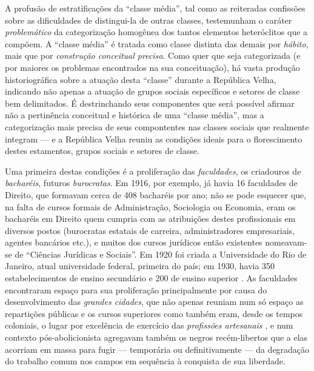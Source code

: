 A profusão de estratificações da ``classe média'', tal como as reiteradas confissões sobre as dificuldades de distingui-la de outras classes, testemunham o caráter \textit{problemático} da categorização homogênea dos tantos elementos heteróclitos que a compõem. A ``classe média'' é tratada como classe distinta das demais por \textit{hábito}, mais que por \textit{construção conceitual precisa}. Como quer que seja categorizada (e por maiores os problemas encontrados na sua conceituação), há vasta produção historiográfica sobre a atuação desta ``classe'' durante a República Velha, indicando não apenas a atuação de grupos sociais específicos e setores de classe bem delimitados. É destrinchando seus componentes que será possível afirmar não a pertinência conceitual e histórica de uma ``classe média'', mas a categorização mais precisa de seus compontentes nas classes sociais que realmente integram --- e a República Velha reuniu as condições ideais para o florescimento destes estamentos, grupos sociais e setores de classe. 

Uma primeira destas condições é a proliferação das \textit{faculdades}, os criadouros de \textit{bacharéis}, futuros \textit{burocratas}. Em 1916, por exemplo, já havia 16 faculdades de Direito, que formavam cerca de 408 bacharéis por ano; não se pode esquecer que, na falta de cursos formais de Administração, Sociologia ou Economia, eram os bacharéis em Direito quem cumpria com as atribuições destes profissionais em diversos postos (burocratas estatais de carreira, administradores empresariais, agentes bancários etc.), e muitos dos cursos jurídicos então existentes nomeavam-se de ``Ciências Jurídicas e Sociais''. Em 1920 foi criada a Universidade do Rio de Janeiro, atual universidade federal, primeira do país; em 1930, havia 350 estabelecimentos de ensino secundário e 200 de ensino superior \cite[p.~17]{pinheiro_clamed_1977}. As faculdades encontraram espaço para sua proliferação principalmente por causa do desenvolvimento das \textit{grandes cidades}, que não apenas reuniam num só espaço as repartições públicas e os cursos superiores como também eram, desde os tempos coloniais, o lugar por excelência de exercício das \textit{profissões artesanais} \cite{REIS2012}, e num contexto pós-abolicionista agregavam também os negros recém-libertos que a elas acorriam em massa para fugir --- temporária ou definitivamente --- da degradação do trabalho comum nos campos em sequência à conquista de sua liberdade\cite{AZEVEDO2004, bacelar_negrosalvador_1994}. 

